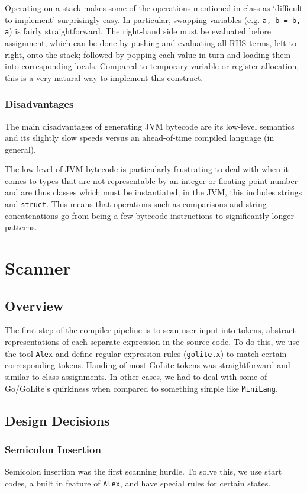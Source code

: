 \documentclass[11pt]{article}
\begin{document}
Operating on a stack makes some of the operations mentioned in class
as `difficult to implement' surprisingly easy. In particular, swapping
variables (e.g. \texttt{a, b = b, a}) is fairly straightforward. The
right-hand side must be evaluated before assignment, which can be done
by pushing and evaluating all RHS terms, left to right, onto the
stack; followed by popping each value in turn and loading them into
corresponding locals. Compared to temporary variable or register
allocation, this is a very natural way to implement this construct.

\subsubsection{Disadvantages}
The main disadvantages of generating JVM bytecode are its low-level
semantics and its slightly slow speeds versus an ahead-of-time
compiled language (in general).

The low level of JVM bytecode is particularly frustrating to deal with
when it comes to types that are not representable by an integer or
floating point number and are thus classes which must be instantiated;
in the JVM, this includes strings and \texttt{struct}. This means that
operations such as comparisons and string concatenations go from being
a few bytecode instructions to significantly longer patterns.
\section{Scanner}
\subsection{Overview}
The first step of the compiler pipeline is to scan user input into
tokens, abstract representations of each separate expression in the
source code. To do this, we use the tool
\texttt{Alex}\cite{github:alex} and define regular expression rules
(\texttt{golite.x}) to match certain corresponding tokens. Handing of
most GoLite tokens was straightforward and similar to class
assignments. In other cases, we had to deal with some of Go/GoLite's
quirkiness when compared to something simple like \texttt{MiniLang}.

\subsection{Design Decisions}
\subsubsection{Semicolon Insertion}
Semicolon insertion was the first scanning hurdle. To solve this, we
use start codes, a built in feature of \texttt{Alex}, and have special
rules for certain states.
\end{document}
